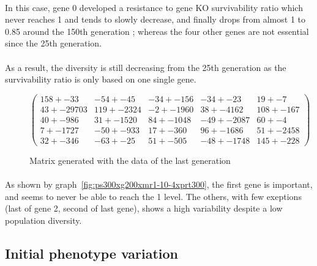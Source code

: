 \documentclass[]{report} %
\begin{document}
    \paragraph*{}
    In this case, gene 0 developed a resistance to gene KO survivability ratio which never reaches 1 and tends to slowly decrease, 
    and finally drops from almost 1 to 0.85 around the 150th generation ; whereas the four other genes are not essential since the 25th generation.
    \paragraph*{}
    As a result, the diversity is still decreasing from the 25th generation as the survivability ratio is only based on one single gene.

    \begin{figure}[H] 
            \centering
            \small
    $
          \begin{pmatrix}
                158 +- 33 & -54 +- 45 & -34 +- 156 & -34 +- 23 & 19 +- 7 \\
                43 +- 29703 & 119 +- 2324 & -2 +- 1960 & 38 +- 4162 & 108 +- 167 \\
                40 +- 986 & 31 +- 1520 & 84 +- 1048 & -49 +- 2087 & 60 +- 4 \\
                7 +- 1727 & -50 +- 933 & 17 +- 360 & 96 +- 1686 & 51 +- 2458 \\
                32 +- 346 & -63 +- 25 & 51 +- 505 & -48 +- 1748 & 145 +- 228 
           \end{pmatrix}
    $
            \caption{\footnotesize Matrix generated with the data of the last generation}
            \label{mat:ps300xg200xmr1-10-4xprt300}
    \end{figure}
    \paragraph*{}
    As shown by graph~\ref{fig:ps300xg200xmr1-10-4xprt300}, the first gene is important, and seems to never be able to reach the 1 level.
    The others, with few exeptions (last of gene 2, second of last gene), shows a high variability despite a low population diversity.
    
    
    
    
    \newpage
\subsection{Initial phenotype variation}
\end{document}

